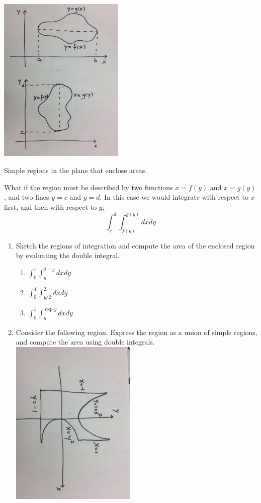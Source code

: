 \documentclass{tufte-handout}
\begin{document}
\begin{marginfigure}
\includegraphics[width=6cm]{figs/simpleregions}
\caption{Simple regions in the plane that enclose areas.} 
\end{marginfigure}

What if the region must be described by two functions $x=f(y)$ and $x = g(y)$, and two lines $y=c$ and $y=d$. In this case we would integrate with respect to $x$ first, and then with respect to $y$,
\[ \int_c^d \int_{f(y)}^{g(y)} dx dy \]

\begin{enumerate}[resume]
\item Sketch the regions of integration and compute the area of the enclosed region by evaluating the double integral.
\begin{enumerate}
\item $ \int_0^1 \int_y^{2-y} dx dy $
\item $ \int_0^4 \int_{y/2}^2 dx dy $
\item $ \int_0^1 \int_y^{\exp y} dx dy $
\end{enumerate}
\item Consider the following region. Express the region as a union of simple regions, and compute the area using double integrals.
\includegraphics[width=6cm]{figs/weirdregion}
\end{enumerate}
\end{document}
